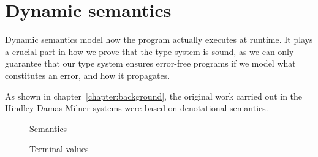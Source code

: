 \section{Dynamic semantics}
Dynamic semantics model how the program actually executes at
runtime. It plays a crucial part in how we prove that the type system
is sound, as we can only guarantee that our type system ensures
error-free programs if we model what constitutes an error, and how it
propagates.

As shown in chapter~\ref{chapter:background}, the original work carried out in the Hindley-Damas-Milner systems were
based on denotational semantics.

\begin{figure}
  \caption{Semantics}
\end{figure}

\begin{figure}
  \caption{Terminal values}
\end{figure}

